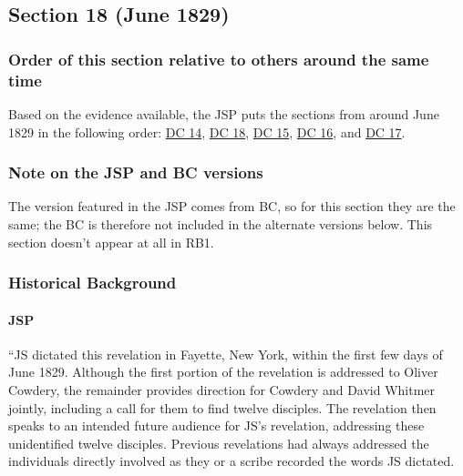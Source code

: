 \subsection{Section 18 (June 1829)}
	\label{DC18}
	
	\subsubsection{Order of this section relative to others around the same time}
	
		Based on the evidence available, the JSP puts the sections from around June 1829 in the following order: \hyperref[DC14]{DC 14}, \hyperref[DC18]{DC 18}, \hyperref[DC15]{DC 15}, \hyperref[DC16]{DC 16}, and \hyperref[DC17]{DC 17}.
		
	\subsubsection{Note on the JSP and BC versions}
	
		The version featured in the JSP comes from BC, so for this section they are the same; the BC is therefore not included in the alternate versions below. This section doesn't appear at all in RB1.
	
	\subsubsection{Historical Background}
		\label{DC18-HB}
		
		\paragraph{JSP}
		
			``JS dictated this revelation in Fayette, New York, within the first few days of June 1829. Although the first portion of the revelation is addressed to Oliver Cowdery, the remainder provides direction for Cowdery and David Whitmer jointly, including a call for them to find twelve disciples. The revelation then speaks to an intended future audience for JS's revelation, addressing these unidentified twelve disciples. Previous revelations had always addressed the individuals directly involved as they or a scribe recorded the words JS dictated.
			
